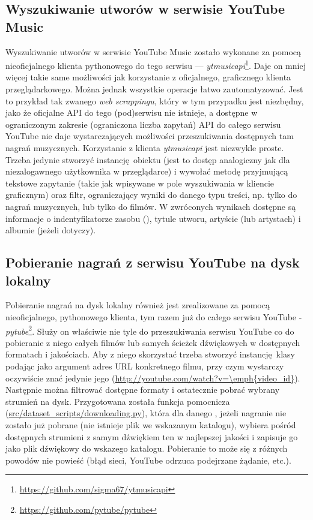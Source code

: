 \subsection{Wyszukiwanie utworów w serwisie YouTube Music}
Wyszukiwanie utworów w serwisie YouTube Music zostało wykonane za pomocą nieoficjalnego klienta
pythonowego do tego serwisu --- \emph{ytmusicapi}\footnote{\url{https://github.com/sigma67/ytmusicapi}}.
Daje on mniej więcej takie same możliwości jak korzystanie z oficjalnego, graficznego klienta
przeglądarkowego. Można jednak wszystkie operacje łatwo zautomatyzować. Jest to przykład tak zwanego
\emph{web scrappingu}, który w tym przypadku jest niezbędny, jako że oficjalne API do tego (pod)serwisu
nie istnieje, a dostępne w ograniczonym zakresie (ograniczona liczba zapytań) API do całego serwisu
YouTube nie daje wystarczających możliwości przeszukiwania dostępnych tam nagrań muzycznych.
Korzystanie z klienta \emph{ytmusicapi} jest niezwykle proste. Trzeba jedynie stworzyć
instancję obiektu  (jest to dostęp analogiczny jak dla niezalogawnego użytkownika w
przeglądarce) i wywołać metodę  przyjmującą tekstowe zapytanie (takie jak wpisywane w
pole wyszukiwania w kliencie graficznym) oraz filtr, ograniczający wyniki do danego typu treści, np.
tylko do nagrań muzycznych, lub tylko do filmów. W zwróconych wynikach dostępne są informacje o
indentyfikatorze zasobu (), tytule utworu, artyście (lub artystach) i albumie
(jeżeli dotyczy).

\subsection{Pobieranie nagrań z serwisu YouTube na dysk lokalny}
Pobieranie nagrań na dysk lokalny również jest zrealizowane za pomocą nieoficjalnego, pythonowego
klienta, tym razem już do całego serwisu YouTube -
\emph{pytube}\footnote{\url{https://github.com/pytube/pytube}}. Służy on właściwie nie tyle do
przeszukiwania serwisu YouTube co do pobieranie z niego całych filmów lub samych ścieżek dźwiękowych
w dostępnych formatach i jakościach. Aby z niego skorzystać trzeba stworzyć instancję klasy
 podając jako argument adres URL konkretnego filmu, przy czym wystarczy oczywiście
znać jedynie jego  (\url{http://youtube.com/watch?v=\emph{video_id}}). Następnie
można filtrować dostępne formaty i ostatecznie pobrać wybrany strumień na dysk. Przygotowana została
funkcja pomocnicza (\url{src/dataset_scripts/downloading.py}), która dla danego ,
jeżeli nagranie nie zostało już pobrane (nie istnieje plik we wskazanym katalogu), wybiera pośród
dostępnych strumieni z samym dźwiękiem ten w najlepszej jakości i zapisuje go jako plik dźwiękowy do
wskazego katalogu. Pobieranie to może się z różnych powodów nie powieść (błąd sieci, YouTube odrzuca
podejrzane żądanie, etc.).

